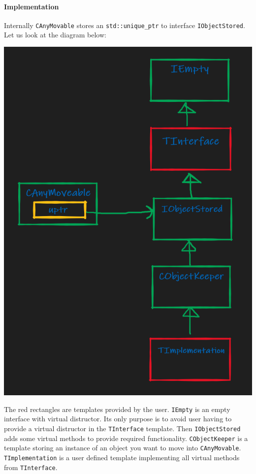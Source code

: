 \documentclass{article}
\begin{document}
\paragraph{Implementation}
Internally \verb"CAnyMovable" stores an \verb"std::unique_ptr" to interface \verb"IObjectStored". Let us look at the diagram below:
\begin{center}
\includegraphics[scale = 0.5]{Figures/CAnyMovable.png}
\end{center}
The red rectangles are templates provided by the user. \verb"IEmpty" is an empty interface with virtual distructor. Its only purpose is to avoid user having to provide a virtual distructor in the \verb"TInterface" template. Then \verb"IObjectStored" adds some virtual methods to provide required functionality. \verb"CObjectKeeper" is a template storing an instance of an object you want to move into \verb"CAnyMovable". \verb"TImplementation" is a user defined template implementing all virtual methods from \verb"TInterface".
\end{document}

